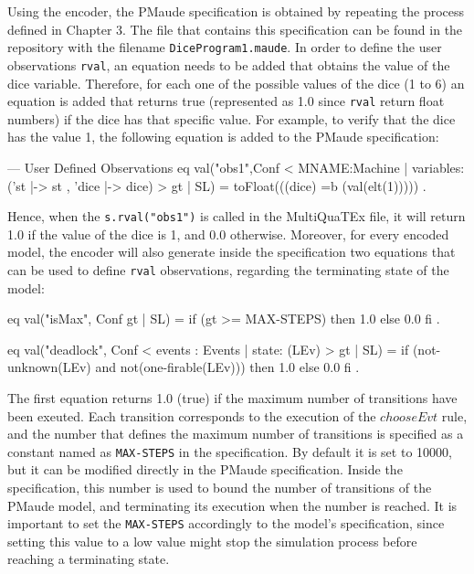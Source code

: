 Using the encoder, the PMaude specification is obtained by repeating the process defined in Chapter 3. The file that contains this specification can be found in the repository with the filename \texttt{DiceProgram1.maude}. In order to define the user observations \texttt{rval}, an equation needs to be added that obtains the value of the dice variable. Therefore, for each one of the possible values of the dice (1 to 6) an equation is added that returns true (represented as 1.0 since \texttt{rval} return float numbers) if the dice has that specific value. For example, to verify that the dice has the value 1, the following equation is added to the PMaude specification:
\begin{maude}

  --- User Defined Observations 
eq val("obs1",{Conf < MNAME:Machine | 
                    variables:('st |-> st , 'dice |-> dice) >} 
                    {gt | SL}) 
                    = toFloat(((dice) =b (val(elt(1))))) .
\end{maude}
Hence, when the \texttt{s.rval("obs1")} is called in the MultiQuaTEx file, it will return 1.0 if the value of the dice is 1, and 0.0 otherwise. Moreover, for every encoded model, the encoder will also generate inside the specification two equations that can be used to define \texttt{rval} observations, regarding the terminating state of the model:
\begin{maude}

eq val("isMax", {Conf} {gt | SL}) = if (gt >= MAX-STEPS) 
                                    then 1.0 
                                    else 0.0 fi .

 eq val("deadlock", {Conf < events : Events | state: (LEv) >} 
                    {gt | SL}) = if (not-unknown(LEv) and 
                                    not(one-firable(LEv))) 
                                 then 1.0 
                                 else 0.0 fi .
\end{maude}
The first equation returns 1.0 (true) if the maximum number of transitions have been exeuted. Each transition corresponds to the execution of the $chooseEvt$ rule, and the number that defines the maximum number of transitions is specified as a constant named as \texttt{MAX-STEPS} in the specification. By default it is set to 10000, but it can be modified directly in the PMaude specification. Inside the specification, this number is used to bound the number of transitions of the PMaude model, and terminating its execution when the number is reached. It is important to set the \texttt{MAX-STEPS} accordingly to the model's specification, since setting this value to a low value might stop the simulation process before reaching a terminating state.

